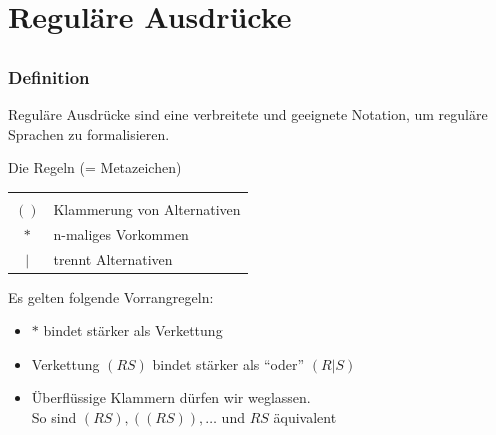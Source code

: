 
\section{Reguläre Ausdrücke}
\subsection*{}

\begin{frame}
  \frametitle{Definition}

  Reguläre Ausdrücke sind eine verbreitete und geeignete Notation, um reguläre
  Sprachen zu formalisieren.

	\begin{block}{Die Regeln (= Metazeichen)}
		\begin{tabular}{c p{}}
				\xb{Metazeichen} & 	\xb{Bedeutung} \\
				$( )$			& Klammerung von Alternativen\\
				$*$			& n-maliges Vorkommen\\
				$|$			& trennt Alternativen\\
		\end{tabular}
	\end{block}

  \begin{block}{Es gelten folgende Vorrangregeln:}
   \begin{itemize}
      \item $*$ bindet stärker als Verkettung
      \item Verkettung $(RS)$ bindet stärker als "`oder"' $(R|S)$
      \item Überflüssige Klammern dürfen wir weglassen. \\
      So sind $(RS),((RS)),\ldots$ und $RS$ äquivalent
    \end{itemize}
  \end{block}
\end{frame}


